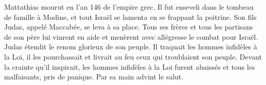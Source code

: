 Mattathias mourut en l’an 146 de l’empire grec.
Il fut enseveli dans le tombeau de famille à Modine,
	et tout Israël se lamenta en se frappant la poitrine.
Son fils Judas, appelé Maccabée, se leva à sa place.
Tous ses frères et tous les partisans de son père lui vinrent en aide
	et menèrent avec allégresse le combat pour Israël.
Judas étendit le renom glorieux de son peuple. 
Il traquait les hommes infidèles à la Loi,
	il les pourchassait et livrait au feu ceux qui troublaient son peuple.
Devant la crainte qu’il inspirait, les hommes infidèles à la Loi furent abaissés
	et tous les malfaisants, pris de panique.
Par sa main advint le salut.
